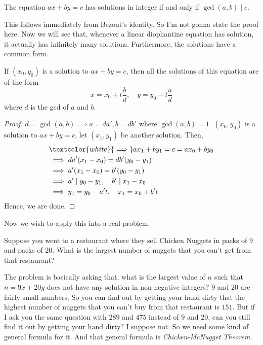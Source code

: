 \documentclass[11pt]{scrartcl}
\begin{document}
\begin{corollary}
The equation \(ax+by=c\) has solutions in integer if and only if \(\gcd(a,b) \mid c\).
\end{corollary}
This follows immediately from Bezout's identity. So I'm not gonna state the proof here. Now we will see that, whenever a linear diophantine equation has solution, it actually has infinitely many solutions. Furthermore, the solutions have a common form.
\begin{lemma}
If \((x_0, y_0)\) is a solution to \(ax+by = c\), then all the solutions of this equation are of the form \[x = x_0 + t\frac{b}{d}, \quad y= y_0 - t\frac{a}{d}\]
where \(d\) is the gcd of \(a\) and \(b\).
\end{lemma}
\begin{proof}
\(d = \gcd(a,b) \implies a = da', b=db'\) where \(\gcd(a,b)=1\). \((x_0, y_0)\) is a solution to \(ax+by = c\), let \((x_1, y_1)\) be another solution. Then,
\begin{equation*}
\begin{split}
&\textcolor{white}{\implies} ax_1+by_1 = c = ax_0+by_0 \\
&\implies da'(x_1- x_0) = db'(y_0 - y_1) \\
&\implies a'(x_1- x_0) = b'(y_0 - y_1) \\
&\implies a'\mid y_0 - y_1 , \quad b' \mid x_1- x_0 \\
&\implies y_1 = y_0 - a't , \quad x_1 = x_0 + b't
\end{split}
\end{equation*}
Hence, we are done.
\end{proof}
Now we wish to apply this into a real problem. 
\begin{exercise}
Suppose you went to a restaurant where they sell Chicken Nuggets in packs of \(9\) and packs of \(20\). What is the largest number of nuggets that you can't get from that restaurant?
\end{exercise}
The problem is basically asking that, what is the largest value of \(n\) such that \(n = 9x + 20 y\) does not have any solution in non-negative integers? \(9\) and \(20\) are fairly small numbers. So you can find out by getting your hand dirty that the highest number of nuggets that you can't buy from that restaurant is \(151\). But if I ask you the same question with \(289\) and \(475\) instead of \(9\) and \(20\), can you still find it out by getting your hand dirty? I suppose not. So we need some kind of general formula for it. And that general formula is \textit{Chicken-McNugget Theorem}.
\end{document}
